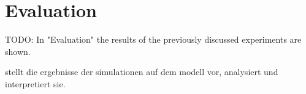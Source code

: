 \documentclass[Bachelorarbeit.tex]{subfiles}
\begin{document}
\chapter{Evaluation}
TODO:
In "Evaluation" the results of the previously discussed experiments are shown.

stellt die ergebnisse der simulationen auf dem modell vor, analysiert und interpretiert sie.
\end{document}
